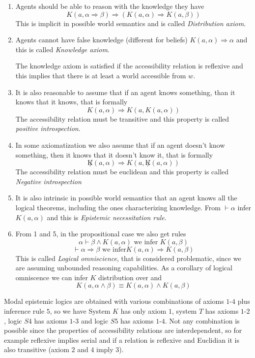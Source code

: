 \begin{enumerate}
   \item Agents should be able to reason with the knowledge they have
         \[ K(a , \alpha \Rightarrow \beta) \Rightarrow (K(a, \alpha) \Rightarrow 
	    K(a, \beta)) \]
	 This is implicit in possible world semantics and is called 
	 \emph{Distribution axiom}.
   \item Agents cannot have false knowledge (different for beliefs)
         $K(a, \alpha) \Rightarrow  \alpha$ and this is called \emph{Knowledge axiom}.

	 The knowledge axiom is satisfied if the accessibility relation is reflexive and 
         this implies that there is at least a world accessible from $w$.

   \item It is also reasonable to assume that if an agent knows something, than it 
	 knows that it knows, that is formally
	 \[ K(a, \alpha) \Rightarrow K(a, K(a, \alpha)) \]
	 The accessibility relation must be transitive and this property is called
	 \emph{positive introspection}.
   \item In some axiomatization we also assume that if an agent doesn't know something,
         then it knows that it doesn't know it, that is formally
	 \[ \not K(a, \alpha) \Rightarrow K(a, \not K(a, \alpha)) \]
	The accessibility relation must be euclidean and this property is called
	\emph{Negative introspection}
   \item It is also intrinsic in possible world semantics that an agent knows all
	 the logical theorems, including the ones characterizing knowledge.\newline
         From $\vdash \alpha$ infer $K(a, \alpha)$ and this is 
	 \emph{Epistemic necessitation rule}.
   \item From 1 and 5, in the propositional case we also get rules
	 \[ \alpha \vdash \beta \land K(a, \alpha) \text{ we infer } K(a, \beta) \]
	 \[ \vdash \alpha \Rightarrow \beta \text{ we infer} 
	    K(a, \alpha) \Rightarrow K(a, \beta) \]
	 This is called \emph{Logical omniscience}, that is considered problematic,
	 since we are assuming unbounded reasoning capabilities.\newline
	As a corollary of logical omniscence we can infer $K$ distribution over and
	\[ K(a, \alpha \land \beta) \equiv K(a, \alpha) \land K(a, \beta) \]
\end{enumerate}

Modal epistemic logics are obtained with various combinations of axioms $1$-$4$ 
plus inference rule $5$, so we have System $K$ has only axiom $1$, system $T$ has 
axioms $1$-$2$, logic $S4$ has axioms $1$-$3$ and logic $S5$ has axioms $1$-$4$.\newline
Not any combination is possible since the properties of accessibility relations are
interdependent, so for example reflexive implies serial and if a relation is 
reflexive and Euclidian it is also transitive (axiom $2$ and $4$ imply $3$).

